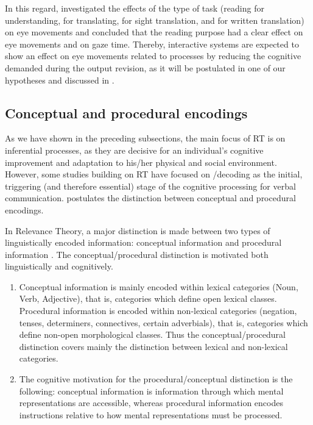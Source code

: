 \documentclass[output=paper]{langsci/langscibook}
\begin{document}
In this regard, \citet{jakobsen2008} investigated the effects of the type of task (reading for understanding, for translating, for sight translation, and for written translation) on eye movements and concluded that the reading purpose had a clear effect on eye movements and on gaze time. Thereby, interactive systems are expected to show an effect on eye movements related to  processes by reducing the cognitive  demanded during the output revision, as it will be postulated in one of our hypotheses and discussed in .


\subsection{Conceptual and procedural encodings\label{alves:sec:ConceptualAndProceduralEncodings}}

As we have shown in the preceding subsections, the main focus of RT is on inferential processes, as they are decisive for an individual's cognitive improvement and adaptation to his/her physical and social environment. However, some studies building on RT \citep[e.g.][]{moeschler1998, blakemore2002, Wilson2011, alves2003, alves2013} have focused on /decoding as the initial, triggering (and therefore essential) stage of the cognitive processing for verbal communication. \citet{moeschler1998} postulates the distinction between conceptual and procedural encodings.


In Relevance Theory, a major distinction is made between two types of linguistically encoded information: conceptual information and procedural information \citep{wilson1993}. The conceptual/procedural distinction is motivated both linguistically and cognitively.

\begin{enumerate}

\item Conceptual information is mainly encoded within lexical categories (Noun, Verb, Adjective), that is, categories which define open lexical classes. Procedural information is encoded within non-lexical categories (negation, tenses, determiners, connectives, certain adverbials), that is, categories which define non-open morphological classes. Thus the conceptual/pro\-ce\-dur\-al distinction covers mainly the distinction between lexical and non-lexical categories.



\item  The cognitive motivation for the procedural/conceptual distinction is the following: conceptual information is information through which mental representations are accessible, whereas procedural information encodes instructions relative to how mental representations must be processed. \citep[1]{moeschler1998}

\end{enumerate}
\end{document}
